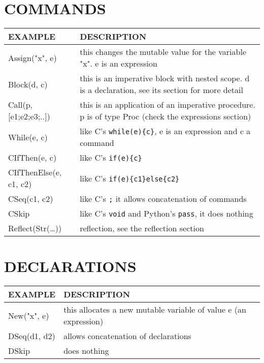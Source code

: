 \documentclass[11pt]{report}
\begin{document}
\chapter{COMMANDS}
\label{sec:orgfff1c39}
\begin{center}
\begin{tabularx}{\textwidth}{lX}
EXAMPLE & DESCRIPTION\\
\hline
Assign("x", e) & this changes the mutable value for the variable "x". e is an expression\\
Block(d, c) & this is an imperative block with nested scope. d is a declaration, see its section for more detail\\
Call(p, [e1;e2;e3;..]) & this is an application of an imperative procedure. p is of type Proc (check the expressions section)\\
While(e, c) & like C's \texttt{while(e)\{c\}}, e is an expression and c a command\\
CIfThen(e, c) & like C's \texttt{if(e)\{c\}}\\
CIfThenElse(e, c1, c2) & like C's \texttt{if(e)\{c1\}else\{c2\}}\\
CSeq(c1, c2) & like C's \texttt{;} it allows concatenation of commands\\
CSkip & like C's \texttt{void} and Python's \texttt{pass}, it does nothing\\
Reflect(Str(\ldots{})) & reflection, see the reflection section\\
\end{tabularx}
\end{center}
\chapter{DECLARATIONS}
\label{sec:orgf74eecc}
\begin{center}
\begin{tabularx}{\textwidth}{lX}
EXAMPLE & DESCRIPTION\\
\hline
New("x", e) & this allocates a new mutable variable of value e (an expression)\\
DSeq(d1, d2) & allows concatenation of declarations\\
DSkip & does nothing\\
\end{tabularx}
\end{center}
\end{document}
